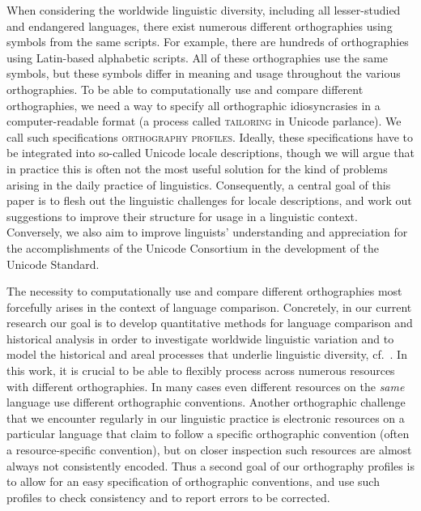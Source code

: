 When considering the worldwide linguistic diversity, including all lesser-studied and endangered languages, there exist numerous different orthographies using symbols from the same scripts. For example, there are hundreds of orthographies using Latin-based alphabetic scripts. All of these orthographies use the same symbols, but these symbols differ in meaning and usage throughout the various orthographies. To be able to computationally use and compare different orthographies, we need a way to specify all orthographic idiosyncrasies in a computer-readable format (a process called \textsc{tailoring} in Unicode parlance). We call such specifications \textsc{orthography profiles}. Ideally, these specifications have to be integrated into so-called Unicode locale descriptions, though we will argue that in practice this is often not the most useful solution for the kind of problems arising in the daily practice of linguistics. Consequently, a central goal of this paper is to flesh out the linguistic challenges for locale descriptions, and work out suggestions to improve their structure for usage in a linguistic context. Conversely, we also aim to improve linguists' understanding and appreciation for the accomplishments of the Unicode Consortium in the development of the Unicode Standard.

The necessity to computationally use and compare different orthographies most forcefully arises in the context of language comparison. Concretely, in our current research our goal is to develop quantitative methods for language comparison and historical analysis in order to investigate worldwide linguistic variation and to model the historical and areal processes that underlie linguistic diversity, cf.~\citet{Steiner_etal2011,List2012,List2012a,ListMoran2013,MoranProkic2013}. In this work, it is crucial to be able to flexibly process across numerous resources with different orthographies. In many cases even different resources on the \textit{same} language use different orthographic conventions. Another orthographic challenge that we encounter regularly in our linguistic practice is electronic resources on a particular language that claim to follow a specific orthographic convention (often a resource-specific convention), but on closer inspection such resources are almost always not consistently encoded. Thus a second goal of our orthography profiles is to allow for an easy specification of orthographic conventions, and use such profiles to check consistency and to report errors to be corrected.

